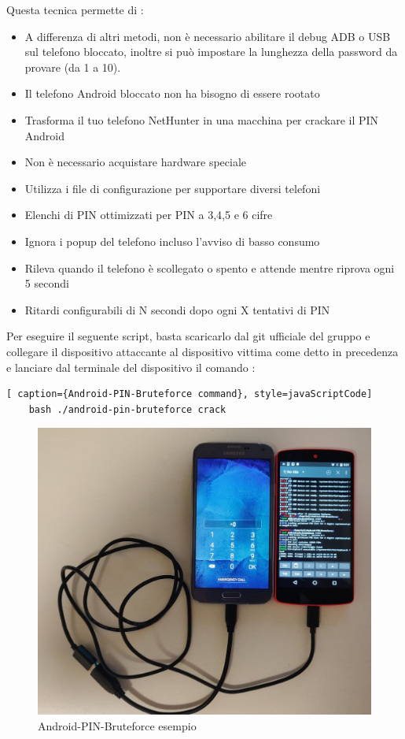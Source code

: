Questa tecnica permette di :
\begin{itemize}
	\item A differenza di altri metodi, non è necessario abilitare il debug ADB o USB sul telefono bloccato, inoltre si può impostare la lunghezza della password da provare (da 1 a 10).
	\item Il telefono Android bloccato non ha bisogno di essere rootato
	\item Trasforma il tuo telefono NetHunter in una macchina per crackare il PIN Android
	\item Non è necessario acquistare hardware speciale
	\item Utilizza i file di configurazione per supportare diversi telefoni
	\item Elenchi di PIN ottimizzati per PIN a 3,4,5 e 6 cifre
	\item Ignora i popup del telefono incluso l’avviso di basso consumo
	\item Rileva quando il telefono è scollegato o spento e attende mentre riprova ogni 5 secondi
	\item Ritardi configurabili di N secondi dopo ogni X tentativi di PIN
\end{itemize}

Per eseguire il seguente script, basta scaricarlo dal git ufficiale del gruppo e collegare il dispositivo attaccante al dispositivo vittima come detto in precedenza e lanciare dal terminale del dispositivo il comando :

\begin{lstlisting}[ caption={Android-PIN-Bruteforce command}, style=javaScriptCode]
	bash ./android-pin-bruteforce crack
\end{lstlisting}

\begin{figure}[h!]
    \centering
    \includegraphics[width=140mm]{Immagini/3/brute.jpg}
    \caption{Android-PIN-Bruteforce esempio}
    \label{fig:Android-PIN-Bruteforce}
\end{figure}

